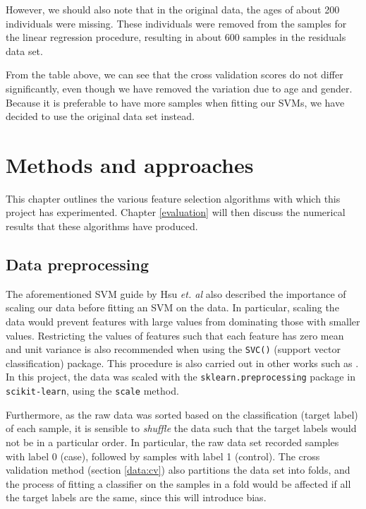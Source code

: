 \documentclass[12pt, twoside, a4paper]{report}
\begin{document}
However, we should also note that in the original data, the ages of about 200 individuals were missing. These individuals were removed from the samples for the linear regression procedure, resulting in about 600 samples in the residuals data set.

From the table above, we can see that the cross validation scores do not differ significantly, even though we have removed the variation due to age and gender. Because it is preferable to have more samples when fitting our SVMs, we have decided to use the original data set instead.


\chapter{Methods and approaches}
\label{methods}

This chapter outlines the various feature selection algorithms with which this project has experimented. Chapter \ref{evaluation} will then discuss the numerical results that these algorithms have produced. 

\section{Data preprocessing}

The aforementioned SVM guide by Hsu \textit{et. al} also described the importance of scaling our data before fitting an SVM on the data. In particular, scaling the data would prevent features with large values from dominating those with smaller values. Restricting the values of features such that each feature has zero mean and unit variance is also recommended when using the \texttt{SVC()} (support vector classification) package. This procedure is also carried out in other works such as \cite{RefWorks:228}. In this project, the data was scaled with the \texttt{sklearn.preprocessing} package in \texttt{scikit-learn}, using the \texttt{scale} method.

Furthermore, as the raw data was sorted based on the classification (target label) of each sample, it is sensible to \textit{shuffle} the data such that the target labels would not be in a particular order. In particular, the raw data set recorded samples with label 0 (case), followed by samples with label 1 (control). The cross validation method (section \ref{data:cv}) also partitions the data set into folds, and the process of fitting a classifier on the samples in a fold would be affected if all the target labels are the same, since this will introduce bias.
\end{document}
